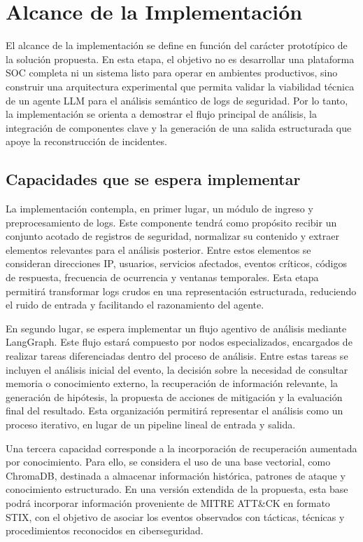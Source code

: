 \section{Alcance de la Implementación}

El alcance de la implementación se define en función del carácter prototípico de la solución propuesta. En esta etapa, el objetivo no es desarrollar una plataforma SOC completa ni un sistema listo para operar en ambientes productivos, sino construir una arquitectura experimental que permita validar la viabilidad técnica de un agente LLM para el análisis semántico de logs de seguridad. Por lo tanto, la implementación se orienta a demostrar el flujo principal de análisis, la integración de componentes clave y la generación de una salida estructurada que apoye la reconstrucción de incidentes.

\subsection{Capacidades que se espera implementar}

La implementación contempla, en primer lugar, un módulo de ingreso y preprocesamiento de logs. Este componente tendrá como propósito recibir un conjunto acotado de registros de seguridad, normalizar su contenido y extraer elementos relevantes para el análisis posterior. Entre estos elementos se consideran direcciones IP, usuarios, servicios afectados, eventos críticos, códigos de respuesta, frecuencia de ocurrencia y ventanas temporales. Esta etapa permitirá transformar logs crudos en una representación estructurada, reduciendo el ruido de entrada y facilitando el razonamiento del agente.

En segundo lugar, se espera implementar un flujo agentivo de análisis mediante LangGraph. Este flujo estará compuesto por nodos especializados, encargados de realizar tareas diferenciadas dentro del proceso de análisis. Entre estas tareas se incluyen el análisis inicial del evento, la decisión sobre la necesidad de consultar memoria o conocimiento externo, la recuperación de información relevante, la generación de hipótesis, la propuesta de acciones de mitigación y la evaluación final del resultado. Esta organización permitirá representar el análisis como un proceso iterativo, en lugar de un pipeline lineal de entrada y salida.

Una tercera capacidad corresponde a la incorporación de recuperación aumentada por conocimiento. Para ello, se considera el uso de una base vectorial, como ChromaDB, destinada a almacenar información histórica, patrones de ataque y conocimiento estructurado. En una versión extendida de la propuesta, esta base podrá incorporar información proveniente de MITRE ATT\&CK en formato STIX, con el objetivo de asociar los eventos observados con tácticas, técnicas y procedimientos reconocidos en ciberseguridad.

